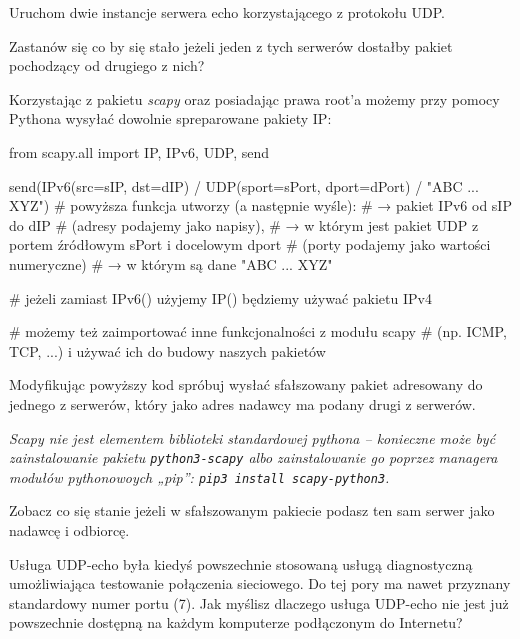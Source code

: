 \dbEntryCheckResults
Uruchom dwie instancje serwera echo korzystającego z protokołu UDP.

Zastanów się co by się stało jeżeli jeden z tych serwerów dostałby pakiet pochodzący od drugiego z nich?

Korzystając z pakietu \textit{scapy} oraz posiadając prawa root'a możemy przy pomocy Pythona wysyłać dowolnie spreparowane pakiety IP:

\begin{CodeFrame*}[python]{}
from scapy.all import IP, IPv6, UDP, send

send(IPv6(src=sIP, dst=dIP) / UDP(sport=sPort, dport=dPort) / "ABC ... XYZ")
# powyższa funkcja utworzy (a następnie wyśle):
#  → pakiet IPv6 od sIP do dIP
#    (adresy podajemy jako napisy),
#  → w którym jest pakiet UDP z portem źródłowym sPort i docelowym dport
#    (porty podajemy jako wartości numeryczne)
#  → w którym są dane "ABC ... XYZ"

# jeżeli zamiast IPv6() użyjemy IP() będziemy używać pakietu IPv4

# możemy też zaimportować inne funkcjonalności z modułu scapy
# (np. ICMP, TCP, ...) i używać ich do budowy naszych pakietów
\end{CodeFrame*}

Modyfikując powyższy kod spróbuj wysłać sfałszowany pakiet adresowany do jednego z serwerów, który jako adres nadawcy ma podany drugi z serwerów.

\textit{Scapy nie jest elementem biblioteki standardowej pythona – konieczne może być zainstalowanie pakietu \texttt{python3-scapy} albo zainstalowanie go poprzez managera modułów pythonowoych „pip”: \texttt{pip3 install scapy-python3}.}
\fi

\dbEntryCheckResults
Zobacz co się stanie jeżeli w sfałszowanym pakiecie podasz ten sam serwer jako nadawcę i odbiorcę.

Usługa UDP-echo była kiedyś powszechnie stosowaną usługą diagnostyczną umożliwiająca testowanie połączenia sieciowego. Do tej pory ma nawet przyznany standardowy numer portu (7).
Jak myślisz dlaczego usługa UDP-echo nie jest już powszechnie dostępną na każdym komputerze podłączonym do Internetu?
\fi


